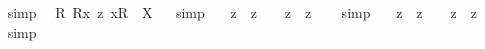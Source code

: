 \begin{isabellebody}
\isadelimproof
\ %
\endisadelimproof
%
\isatagproof
{}\isamarkupfalse%
\ {\isacharparenleft}simp{\isacharparenright}\ \isamarkupfalse%
%
\endisatagproof
{\isafoldproof}%
%
\isadelimproof
%
\endisadelimproof
\isanewline
{}\isamarkupfalse%
\ {\isachardoublequoteopen}{\isasymforall}{\isacharparenleft}{\isasymlambda}R{\isachardot}\ {\isacharless}{\isachardot}R{\isachardot}{\isasymbullet}{\isachardot}x{\isachardot}{\isachargreater}\ {\isasymrightarrow}\isactrlsup z\ {\isacharless}{\isachardot}x{\isachardot}{\isasymcirc}{\isachardot}R{\isachardot}{\isachargreater}{\isacharparenright}\ {\isacharequal}\ X{\isachardoublequoteclose}%
\isadelimproof
\ %
\endisadelimproof
%
\isatagproof
{}\isamarkupfalse%
\ {\isacharparenleft}simp{\isacharparenright}\ \isamarkupfalse%
%
\endisatagproof
{\isafoldproof}%
%
\isadelimproof
%
\endisadelimproof
%
\isamarkuptrue%
\isamarkupfalse%
\ {\isachardoublequoteopen}{\isacharcomma}{\isasymphi}{\isacharcomma}\ {\isasymand}\isactrlsup z\ {\isacharcomma}{\isasympsi}{\isacharcomma}\ {\isasymrightarrow}\isactrlsup z\ {\isacharcomma}{\isasymchi}{\isacharcomma}\ {\isasymequiv}\ {\isacharparenleft}{\isacharcomma}{\isasymphi}{\isacharcomma}\ {\isasymand}\isactrlsup z\ {\isacharcomma}{\isasympsi}{\isacharcomma}{\isacharparenright}\ {\isasymrightarrow}\isactrlsup z\ {\isacharcomma}{\isasymchi}{\isacharcomma}{\isachardoublequoteclose}%
\isadelimproof
\ %
\endisadelimproof
%
\isatagproof
{}\isamarkupfalse%
\ {\isacharparenleft}simp{\isacharparenright}\ \isamarkupfalse%
%
\endisatagproof
{\isafoldproof}%
%
\isadelimproof
%
\endisadelimproof
\isanewline
{}\isamarkupfalse%
\ {\isachardoublequoteopen}{\isacharcomma}{\isasymphi}{\isacharcomma}\ {\isasymand}\isactrlsup z\ {\isacharcomma}{\isasympsi}{\isacharcomma}\ {\isasymrightarrow}\isactrlsup z\ {\isacharcomma}{\isasymchi}{\isacharcomma}\ {\isasymequiv}\ {\isacharcomma}{\isasymphi}{\isacharcomma}\ {\isasymand}\isactrlsup z\ {\isacharparenleft}{\isacharcomma}{\isasympsi}{\isacharcomma}\ {\isasymrightarrow}\isactrlsup z\ {\isacharcomma}{\isasymchi}{\isacharcomma}{\isacharparenright}{\isachardoublequoteclose}%
\isadelimproof
\ %
\endisadelimproof
%
\isatagproof
{}\isamarkupfalse%
\ {\isacharparenleft}simp{\isacharparenright}%
\endisatagproof
{\isafoldproof}%
%
\isadelimproof
%
\endisadelimproof
\ \isamarkupfalse%
%
\isadelimproof
\ %
\endisadelimproof
%
\isatagproof

\end{isabellebody}
